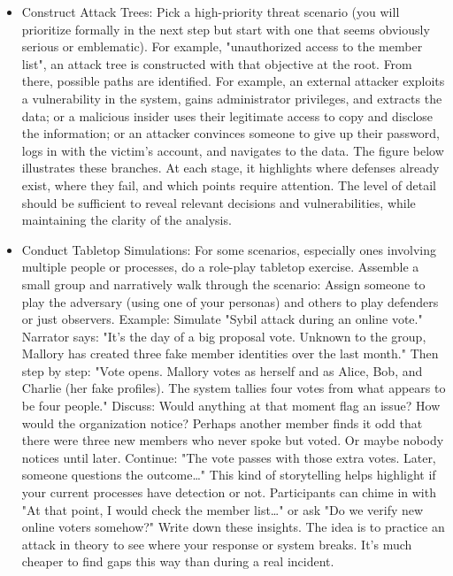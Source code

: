 \begin{itemize}   
    \item Construct Attack Trees: Pick a high-priority threat scenario (you will prioritize
    formally in the next step but start with one that seems obviously serious or emblematic).
    For example, "unauthorized access to the member list", an attack tree is
    constructed with that objective at the root. From there, possible paths are identified.
    For example, an external attacker exploits a vulnerability in the system, gains administrator privileges, and
    extracts the data; or a malicious insider uses their legitimate access to copy
    and disclose the information; or an attacker convinces someone to give up their
    password, logs in with the victim's account, and navigates to the data. The
    figure below illustrates these branches. At each stage, it highlights where
    defenses already exist, where they fail, and which points require attention. The
    level of detail should be sufficient to reveal relevant decisions and
    vulnerabilities, while maintaining the clarity of the analysis.

    \item Conduct Tabletop Simulations: For some scenarios, especially ones involving multiple people or
    processes, do a role-play tabletop exercise. Assemble a small group and narratively walk through the
    scenario: Assign someone to play the adversary (using one of your personas) and others to play
    defenders or just observers. Example: Simulate "Sybil attack during an online vote." Narrator says:
    "It's the day of a big proposal vote. Unknown to the group, Mallory has created three fake member identities over
    the last month." Then step by step: "Vote opens. Mallory votes as herself and as Alice, Bob, and
    Charlie (her fake profiles). The system tallies four votes from what appears to be four people."
    Discuss: Would anything at that moment flag an issue? How would the organization notice? Perhaps another
    member finds it odd that there were three new members who never spoke but voted. Or maybe nobody
    notices until later. Continue: "The vote passes with those extra votes. Later, someone questions the
    outcome…" This kind of storytelling helps highlight if your current processes have detection or not.
    Participants can chime in with "At that point, I would check the member list…" or ask "Do we verify
    new online voters somehow?" Write down these insights. The idea is to practice an attack in theory
    to see where your response or system breaks. It's much cheaper to find gaps this way than during
    a real incident.
    

\end{itemize}
